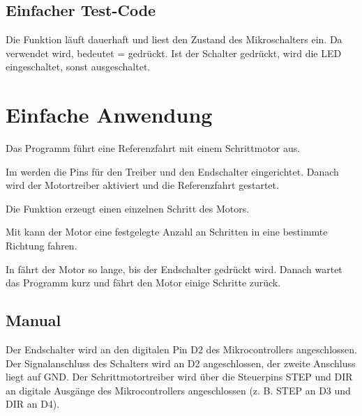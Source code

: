 \subsection{Einfacher Test-Code}

Die Funktion  läuft dauerhaft und liest den Zustand des Mikroschalters ein.
Da  verwendet wird, bedeutet  = gedrückt.
Ist der Schalter gedrückt, wird die LED eingeschaltet, sonst ausgeschaltet.



{
	\label{lst:microswitch-led}
}


\section{Einfache Anwendung}



Das Programm führt eine Referenzfahrt mit einem Schrittmotor aus.

Im  werden die Pins für den Treiber und den Endschalter eingerichtet. Danach wird der Motortreiber aktiviert und die Referenzfahrt gestartet.

Die Funktion  erzeugt einen einzelnen Schritt des Motors.

Mit  kann der Motor eine festgelegte Anzahl an Schritten in eine bestimmte Richtung fahren.

In  fährt der Motor so lange, bis der Endschalter gedrückt wird. Danach wartet das Programm kurz und fährt den Motor einige Schritte zurück.

\subsection{Manual}

Der Endschalter wird an den digitalen Pin D2 des Mikrocontrollers angeschlossen. 
Der Signalanschluss des Schalters wird an D2 angeschlossen, der zweite Anschluss liegt auf GND. 
Der Schrittmotortreiber wird über die Steuerpins STEP und DIR an digitale Ausgänge des Mikrocontrollers angeschlossen (z. B. STEP an D3 und DIR an D4). 



{
	\label{lst:referenzfahrt}
}







